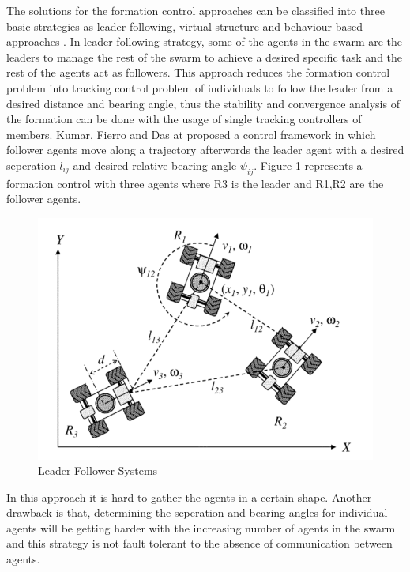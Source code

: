 The solutions for the formation control approaches can be classified into three basic strategies as leader-following, virtual structure and behaviour based approaches \cite{12}.  In leader following strategy, some of the agents in the swarm are the leaders to manage the rest of the swarm to achieve a desired specific task and the rest of the agents act as followers. This approach reduces the formation control problem into tracking control problem of individuals to follow the leader from a desired distance and bearing angle, thus the stability and convergence analysis of the formation can be done with the usage of single tracking controllers of members. Kumar, Fierro and Das at \cite{18} proposed a control framework in which follower agents move along a trajectory afterwords the leader agent with a desired seperation $l_{ij}$ and desired relative bearing angle $\psi_{ij}$.  Figure \ref{leader_follower_ref} represents a formation control with three agents where R3 is the leader and R1,R2 are the follower agents. 

\begin{figure}[H]
	\caption{Leader-Follower Systems \cite{18}} \label{leader_follower_ref}
	\centering
	\includegraphics[scale = 0.5]{leader}
\end{figure}


In this approach it is hard to gather the agents in a certain shape. Another drawback is that, determining the seperation and bearing angles for individual agents will be getting harder with the increasing number of agents in the swarm and this strategy is not fault tolerant to the absence of communication between agents.


